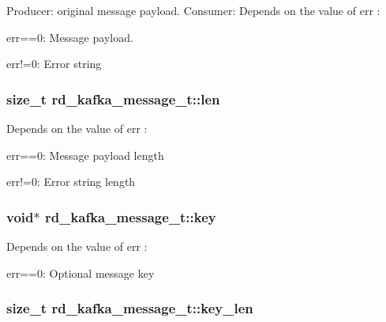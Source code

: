 \label{structrd__kafka__message__t_aa78acb7414a91d7009268e84b1526b7f}
Producer: original message payload. Consumer: Depends on the value of {\ttfamily err} :
\begin{DoxyItemize}
\item {\ttfamily err==0}: Message payload.
\item {\ttfamily err!=0}: Error string 
\end{DoxyItemize}\hypertarget{structrd__kafka__message__t_a27c4e215c06110e44eec144d449400ae}{
\subsubsection[{len}]{\setlength{\rightskip}{0pt plus 5cm}size\_\-t {\bf rd\_\-kafka\_\-message\_\-t::len}}}
\label{structrd__kafka__message__t_a27c4e215c06110e44eec144d449400ae}
Depends on the value of {\ttfamily err} :
\begin{DoxyItemize}
\item {\ttfamily err==0}: Message payload length
\item {\ttfamily err!=0}: Error string length 
\end{DoxyItemize}\hypertarget{structrd__kafka__message__t_a93cbea9d4fb7cfc3e7f546bc5d5f39e2}{
\subsubsection[{key}]{\setlength{\rightskip}{0pt plus 5cm}void$\ast$ {\bf rd\_\-kafka\_\-message\_\-t::key}}}
\label{structrd__kafka__message__t_a93cbea9d4fb7cfc3e7f546bc5d5f39e2}
Depends on the value of {\ttfamily err} :
\begin{DoxyItemize}
\item {\ttfamily err==0}: Optional message key 
\end{DoxyItemize}\hypertarget{structrd__kafka__message__t_a170276e797dab0eb732db4eecd329a95}{
\subsubsection[{key\_\-len}]{\setlength{\rightskip}{0pt plus 5cm}size\_\-t {\bf rd\_\-kafka\_\-message\_\-t::key\_\-len}}}
